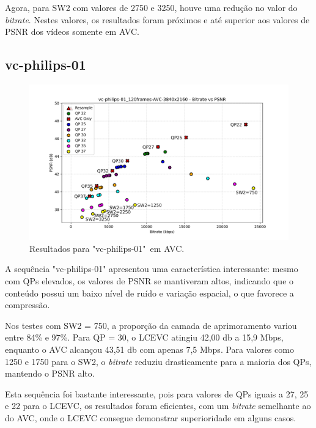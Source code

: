 Agora, para SW2 com valores de 2750 e 3250, houve uma redução no valor do \textit{bitrate}.
Nestes valores, os resultados foram próximos e até superior aos valores de \acrshort{PSNR}
dos vídeos somente em \acrshort{AVC}.

\newpage

\subsection{vc-philips-01}

\begin{figure}[h]
    \centering
    \includegraphics[width=1.0\textwidth]{img/vc-philips-01_120frames-AVC.png}
    \caption{Resultados para "vc-philips-01"\ em \acrshort{AVC}.}
    \label{fig:vc-philips-01}
\end{figure}

A sequência "vc-philips-01" apresentou uma característica interessante: mesmo
com QPs elevados, os valores de \acrshort{PSNR} se mantiveram altos, indicando
que o conteúdo possui um baixo nível de ruído e variação espacial, o que
favorece a compressão.

Nos testes com SW2 = 750, a proporção da camada de aprimoramento variou entre
84\% e 97\%. Para QP = 30, o \acrshort{LCEVC} atingiu 42,00 db a 15,9 Mbps,
enquanto o \acrshort{AVC} alcançou 43,51 db com apenas 7,5 Mbps. Para valores 
como 1250 e 1750 para o SW2, o \textit{bitrate} reduziu drasticamente
para a maioria dos QPs, mantendo o \acrshort{PSNR} alto.

Esta sequência foi bastante interessante, pois para valores de QPs iguais
a 27, 25 e 22 para o \acrshort{LCEVC}, os resultados foram eficientes,
com um \textit{bitrate} semelhante ao do \acrshort{AVC}, onde o \acrshort{LCEVC}
consegue demonstrar superioridade em alguns casos. 

